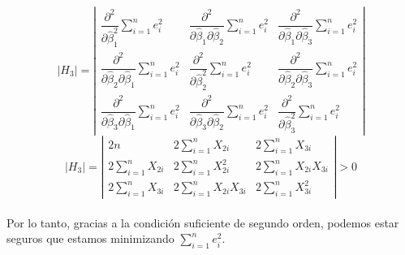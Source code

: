 \documentclass[10pt,a4paper, openany ]{book}
\begin{document}
  \begin{equation*}
      \left | H_{3} \right | =  \left |\begin{array}{ccc}
          \dfrac{\partial^{2}}{\partial\hat{\beta}^{2}_{1}}\sum\limits_{i = 1}^{n}e_{i}^{2}     &  \dfrac{\partial^{2}}{\partial\hat{\beta}_{1}\partial\hat{\beta}_{2}}\sum\limits_{i = 1}^{n}e_{i}^{2}  & \dfrac{\partial^{2}}{\partial\hat{\beta}_{1}\partial\hat{\beta}_{3}}\sum\limits_{i = 1}^{n}e_{i}^{2}  \\
            \dfrac{\partial^{2}}{\partial\hat{\beta}_{2}\partial\hat{\beta}_{1}}\sum\limits_{i = 1}^{n}e_{i}^{2}  &  \dfrac{\partial^{2}}{\partial\hat{\beta}^{2}_{2}}\sum\limits_{i = 1}^{n}e_{i}^{2} & \dfrac{\partial^{2}}{\partial\hat{\beta}_{2}\partial\hat{\beta}_{3}}\sum\limits_{i = 1}^{n}e_{i}^{2} \\ \dfrac{\partial^{2}}{\partial\hat{\beta}_{3}\partial\hat{\beta}_{1}}\sum\limits_{i = 1}^{n}e_{i}^{2} & \dfrac{\partial^{2}}{\partial\hat{\beta}_{3}\partial\hat{\beta}_{2}}\sum\limits_{i = 1}^{n}e_{i}^{2} & \dfrac{\partial^{2}}{\partial\hat{\beta}^{2}_{3}}\sum\limits_{i = 1}^{n}e_{i}^{2} 
      \end{array}   \right |
      \end{equation*}
        \begin{equation*}
        \left | H_{3} \right | =  \left |\begin{array}{ccc}
          2n      &  2\sum\limits_{i=1}^{n}X_{2i}   & 2\sum\limits_{i=1}^{n}X_{3i}  \\
            2\sum\limits_{i=1}^{n}X_{2i}   & 2\sum\limits_{i=1}^{n}X^{2}_{2i} & 2\sum\limits_{i=1}^{n}X_{2i}X_{3i}  \\ 2\sum\limits_{i=1}^{n}X_{3i} &  2\sum\limits_{i=1}^{n}X_{2i}X_{3i} & 2\sum\limits_{i=1}^{n}X^{2}_{3i}
      \end{array}   \right |  > 0
  \end{equation*}
  \vspace{5mm} \\
  Por lo tanto, gracias a la condición suficiente de segundo orden, podemos estar seguros que estamos minimizando $\sum\limits_{i = 1}^{n}e^{2}_{i}$.\, \, \, 
\end{document}
